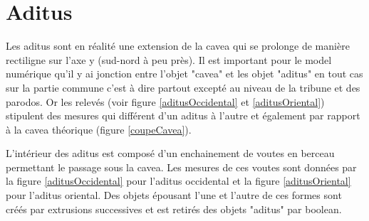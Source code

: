		
		\section{Aditus} 
		
Les aditus sont en réalité une extension de la cavea qui se prolonge de manière rectiligne sur l'axe y (sud-nord à peu près). Il est important pour le model numérique qu'il y ai jonction entre l'objet "cavea" et les objet "aditus" en tout cas sur la partie commune c'est à dire partout excepté au niveau de la tribune et des \gls{parodos}. Or les relevés (voir figure \ref{aditusOccidental} et \ref{aditusOriental}) stipulent des mesures qui différent d'un aditus à l'autre et également par rapport à la cavea théorique (figure \ref{coupeCavea}).


L'intérieur des aditus est composé d'un enchainement de voutes en berceau permettant le passage sous la cavea. Les mesures de ces voutes sont données par la figure \ref{aditusOccidental} pour l'aditus occidental et la figure \ref{aditusOriental} pour l'aditus oriental. Des objets épousant l'une et l'autre de ces formes sont créés par extrusions successives et est retirés des objets "aditus" par \gls{boolean}. 
		
